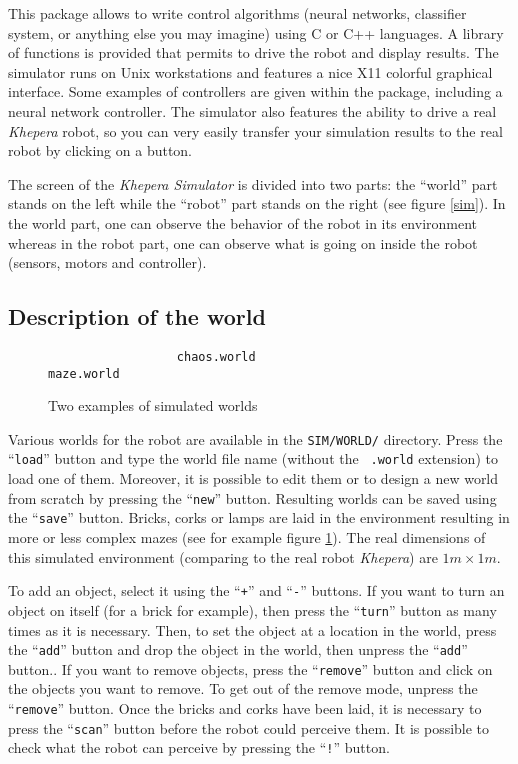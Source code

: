 \documentclass[a4paper,twoside]{article}
\begin{document}
This package allows to write control algorithms (neural networks, classifier
system, or anything else you may imagine) using C or C++ languages. A library
of functions is provided that permits to drive the robot and display results.
The simulator runs on Unix workstations and features a nice X11 colorful
graphical interface. Some examples of controllers are given within the
package, including a neural network controller. The simulator also features
the ability to drive a real {\em Khepera} robot, so you can very easily
transfer your simulation results to the real robot by clicking on a button.

The screen of the {\em Khepera Simulator} is divided into two parts: the
``world'' part stands on the left while the ``robot'' part stands on the right
(see figure \ref{sim}). In the world part, one can observe the behavior of the
robot in its environment whereas in the robot part, one can observe what is
going on inside the robot (sensors, motors and controller).

\subsection{Description of the world}

\begin{figure}[hbt]
\hspace{1.2cm}
\begin{verbatim}                  chaos.world                      maze.world\end{verbatim}
\caption{Two examples of simulated worlds}
\label{worlds}
\end{figure}

Various worlds for the robot are available in the {\tt SIM/WORLD/} directory.
Press the ``{\tt load}'' button and type the world file name (without the {\tt
.world} extension) to load one of them. Moreover, it is possible to edit them
or to design a new world from scratch by pressing the ``{\tt new}'' button.
Resulting worlds can be saved using the ``{\tt save}'' button. Bricks, corks
or lamps are laid in the environment resulting in more or less complex mazes
(see for example figure \ref{worlds}). The real dimensions of this simulated
environment (comparing to the real robot {\em Khepera}) are $1m \times 1m$.

To add an object, select it using the ``{\tt +}'' and ``{\tt -}'' buttons. If
you want to turn an object on itself (for a brick for example), then press the
``{\tt turn}'' button as many times as it is necessary. Then, to set the object
at a location in the world, press the ``{\tt add}'' button and drop the object
in the world, then unpress the ``{\tt add}'' button.. If you want to remove
objects, press the ``{\tt remove}'' button and click on the objects you want
to remove. To get out of the remove mode, unpress the ``{\tt remove}''
button. Once the bricks and corks have been laid, it is necessary to press the
``{\tt scan}'' button before the robot could perceive them. It is possible to
check what the robot can perceive by pressing the ``{\tt !}'' button.
\end{document}
